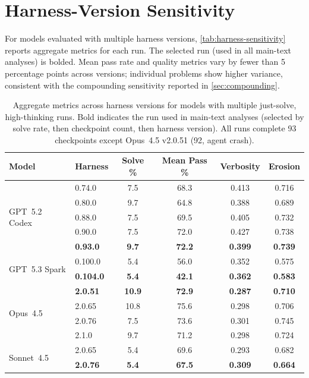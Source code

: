 \section{Harness-Version Sensitivity}\label{sec:harness-sensitivity}

For models evaluated with multiple harness versions, \autoref{tab:harness-sensitivity}
reports aggregate metrics for each run. The selected run (used in all main-text
analyses) is bolded. Mean pass rate and quality metrics vary by fewer than
5 percentage points across versions; individual problems show higher variance,
consistent with the compounding sensitivity reported in \autoref{sec:compounding}.

\begin{table}[h]
\centering
\small
\begin{tabular}{llcccc}
\toprule
Model & Harness & Solve \% & Mean Pass \% & Verbosity & Erosion \\
\midrule
\multirow{5}{*}{GPT~5.2 Codex}
  & 0.74.0            &  7.5 & 68.3 & 0.413 & 0.716 \\
  & 0.80.0            &  9.7 & 64.8 & 0.388 & 0.689 \\
  & 0.88.0            &  7.5 & 69.5 & 0.405 & 0.732 \\
  & 0.90.0            &  7.5 & 72.0 & 0.427 & 0.738 \\
  & \textbf{0.93.0}   &  \textbf{9.7} & \textbf{72.2} & \textbf{0.399} & \textbf{0.739} \\
\midrule
\multirow{2}{*}{GPT~5.3 Spark}
  & 0.100.0           &  5.4 & 56.0 & 0.352 & 0.575 \\
  & \textbf{0.104.0}  &  \textbf{5.4} & \textbf{42.1} & \textbf{0.362} & \textbf{0.583} \\
\midrule
\multirow{4}{*}{Opus~4.5}
  & \textbf{2.0.51}   &  \textbf{10.9} & \textbf{72.9} & \textbf{0.287} & \textbf{0.710} \\
  & 2.0.65            & 10.8 & 75.6 & 0.298 & 0.706 \\
  & 2.0.76            &  7.5 & 73.6 & 0.301 & 0.745 \\
  & 2.1.0             &  9.7 & 71.2 & 0.298 & 0.724 \\
\midrule
\multirow{2}{*}{Sonnet~4.5}
  & 2.0.65            &  5.4 & 69.6 & 0.293 & 0.682 \\
  & \textbf{2.0.76}   &  \textbf{5.4} & \textbf{67.5} & \textbf{0.309} & \textbf{0.664} \\
\bottomrule
\end{tabular}
\caption{Aggregate metrics across harness versions for models with multiple
just-solve, high-thinking runs. Bold indicates the run used in main-text
analyses (selected by solve rate, then checkpoint count, then harness version).
All runs complete 93 checkpoints except Opus~4.5 v2.0.51 (92, agent crash).}
\label{tab:harness-sensitivity}
\end{table}
